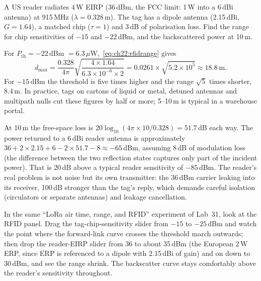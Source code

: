 \begin{worked}
A US reader radiates 4\,W EIRP (36\,dBm, the FCC limit: 1\,W into a 6\,dBi antenna) at 915\,MHz
($\lambda=0.328$\,m). The tag has a dipole antenna (2.15\,dBi, $G=1.64$), a matched chip ($\tau=1$) and
3\,dB of polarisation loss. Find the range for chip sensitivities of $-15$ and $-22$\,dBm, and the
backscattered power at 10\,m.

For $P_{\text{th}}=-22$\,dBm $=6.3\,\mu$W,~\eqref{eq:ch22:rfidrange} gives
\[
d_{\max}=\frac{0.328}{4\pi}\sqrt{\frac{4\times1.64}{6.3\times10^{-6}\times2}}=0.0261\times\sqrt{5.2\times10^5}\approx18.8\ \text{m}.
\]
For $-15$\,dBm the threshold is five times higher and the range $\sqrt5$ times shorter, 8.4\,m. In
practice, tags on cartons of liquid or metal, detuned antennas and multipath nulls cut these figures by
half or more; 5--10\,m is typical in a warehouse portal.

At 10\,m the free-space loss is $20\log_{10}(4\pi\times10/0.328)=51.7$\,dB each way. The power returned
to a 6\,dBi reader antenna is approximately $36+2\times2.15+6-2\times51.7-8\approx-65$\,dBm, assuming
8\,dB of modulation loss (the difference between the two reflection states captures only part of the
incident power). That is 20\,dB above a typical reader sensitivity of $-85$\,dBm. The reader's real
problem is not noise but its own transmitter: the 36\,dBm carrier leaking into its receiver, 100\,dB
stronger than the tag's reply, which demands careful isolation (circulators or separate antennas) and
leakage cancellation.
\end{worked}


\begin{tryit}
In the same ``LoRa air time, range, and RFID'' experiment of Lab~31, look at the RFID panel. Drag the
tag-chip-sensitivity slider from $-15$ to $-25$\,dBm and watch the point where the forward-link curve
crosses the threshold march outwards; then drop the reader-EIRP slider from 36 to about 35\,dBm (the
European 2\,W ERP, since ERP is referenced to a dipole with 2.15\,dBi of gain) and on down to 30\,dBm,
and see the range shrink. The
backscatter curve stays comfortably above the reader's sensitivity throughout.
\end{tryit}

